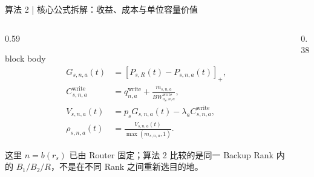 \begin{frame}{算法 2 | 核心公式拆解：收益、成本与单位容量价值}
  \begin{columns}[T,onlytextwidth]
    \begin{column}{0.59\textwidth}
      \begin{beamercolorbox}[rounded=true,sep=1.0ex,wd=\linewidth]{block body}
        \small
        \begin{align*}
          G_{s,n,a}(t)
            &=\left[P_{s,R}(t)-P_{s,n,a}(t)\right]_+,\\[0.35em]
          C_{s,n,a}^{\mathrm{write}}
            &=q_{n,a}^{\mathrm{write}}
              +\frac{m_{s,n,a}}{BW_{o_s,n,a}^{\mathrm{write}}},\\[0.35em]
          V_{s,n,a}(t)
            &=p_sG_{s,n,a}(t)-\lambda_a C_{s,n,a}^{\mathrm{write}},\\[0.35em]
          \rho_{s,n,a}(t)
            &=\frac{V_{s,n,a}(t)}{\max(m_{s,n,a},1)}.
        \end{align*}
      \end{beamercolorbox}

      \vspace{0.14cm}
      \scriptsize
      这里 $n=b(r_s)$ 已由 Router 固定；算法 2 比较的是同一 Backup Rank 内
      的 $B_1/B_2/R$，不是在不同 Rank 之间重新选目的地。
    \end{column}
    \begin{column}{0.38\textwidth}
      \vspace{0.08cm}
      \vspace{0.08cm}
      \vspace{0.08cm}
    \end{column}
  \end{columns}

  \vspace{0.12cm}
\end{frame}

